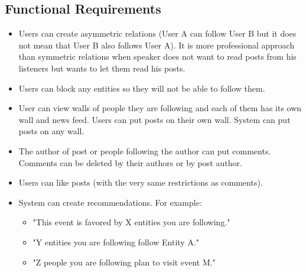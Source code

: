 \documentclass{llncs}
\begin{document}
\subsection{Functional Requirements}
\begin{itemize}
\item Users can create asymmetric relations (User A can follow User B but it
does not mean that User B also follows User A). It is more professional
approach than symmetric relations when speaker does not want to read posts
from his listeners but wants to let them read his posts.
\item Users can block any entities so they will not be able to follow them.
\item User can view walls of people they are following and each of them has
its own wall and news feed. Users can put posts on their own wall. System can
put posts on any wall.
\item The author of post or people following the author can put comments.
Comments can be deleted by their authors or by post author.
\item Users can like posts (with the very same restrictions as comments).
\item System can create recommendations. For example:
\begin{itemize}
\item "This event is favored by X entities you are following."
\item "Y entities you are following follow Entity A."
\item "Z people you are following plan to visit event M."
\end{itemize}
\end{itemize}
\end{document}
